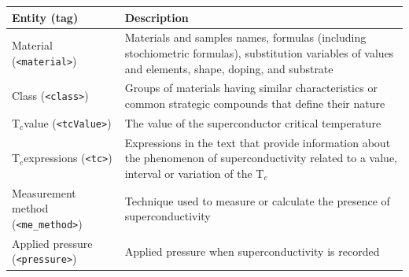 \documentclass[]{interact}
\theoremstyle{plain}%
\theoremstyle{definition}
\theoremstyle{remark}
\newcommand{\tc}{T$_{c}$}
\begin{document}
\begin{table}[ht]
    {\begin{tabular}{m{19em} m{30em}}
        \toprule
        \textbf{Entity} (\textbf{tag})              & \textbf{Description} \\
        \midrule
        Material (\texttt{<material>})              & Materials and samples names, formulas (including stochiometric formulas), substitution variables of values and elements, shape, doping, and substrate               \\
        Class (\texttt{<class>})                    & Groups of materials having similar characteristics or common strategic compounds that define their nature                                                      \\
        \tc value (\texttt{<tcValue>})      & The value of the superconductor critical temperature                                                                                                          \\
        \tc expressions (\texttt{<tc>})     & Expressions in the text that provide information about the phenomenon of superconductivity related to a value, interval or variation of the \tc \\
        Measurement method (\texttt{<me\_method>}) & Technique used to measure or calculate the presence of superconductivity                                                                                     \\
        Applied pressure (\texttt{<pressure>})      & Applied pressure when superconductivity is recorded                                                                                                            \\
        \bottomrule
    \end{tabular}}
    \label{tab:superconductors-parser-entities}
\end{table}
\end{document}

